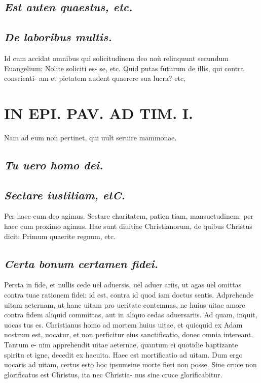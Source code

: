 \documentclass{article}
\begin{document}
\begin{pages}
\subsection*{\textit{Est auten quaestus, etc. }}
{}
\subsection*{\textit{De laboribus multis. }}\pstart Id cum accidat omnibus qui solicitudinem deo noù relinquunt secundum Euangelium: Nolite soliciti es- se, etc. Quid putas futurum de illis, qui contra conscienti- am et pietatem audent quaerere sua lucra? etc,  \pend
\section*{IN EPI. PAV. AD TIM. I. }
\marginpar{[ p.99 ]}\pstart Nam ad eum non pertinet, qui uult seruire mammonae.  \pend
{}
{}
\subsection*{\textit{Tu uero homo dei. }}
{}
\subsection*{\textit{Sectare iustitiam, etC. }}\pstart Per haec cum deo agimus. Sectare charitatem, patien tiam, mansuetudinem: per haec cum proximo agimus. Hae sunt diuitiae Christianorum, de quibus Christus dicit: Primum quaerite regnum, etc.  \pend
{}
{}
\subsection*{\textit{Certa bonum certamen fidei. }}\pstart Persta in fide, et nullis cede uel aduersis, uel aduer ariis, ut agas uel omittas contra tuae rationem fidei: id est, contra id quod iam doctus sentis. Adprehende uitam aeternam, ut hanc uitam pro ueritate contemnas, ne huius uitae amore contra fidem aliquid committas, aut in aliquo cedas aduersariis. Ad quam, inquit, uocas tus es. Christianus homo ad mortem huius uitae, et quicquid ex Adam nostrum est, uocatur, et non perficitur eius sanctificatio, donec omnia intereant. Tantum e- nim apprehendit uitae aeternae, quantum ei quotidie baptizante spiritu et igne, decedit ex hacuita. Haec est mortificatio ad uitam. Dum ergo uocaris ad uitam, certus esto hoc ipsumsine morte fieri non posse. Sine cruce non glorificatus est Christus, ita nec Christia- nus sine cruce glorificabitur.  \pend
{}
{}

\end{pages}
\end{document}
